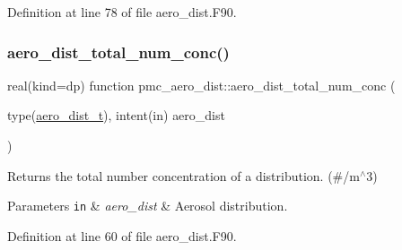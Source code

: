 Definition at line 78 of file aero\+\_\+dist.\+F90.

\mbox{\label{namespacepmc__aero__dist_a1976c9bd301379b91f6c14668315bacf}} 
\subsubsection{\texorpdfstring{aero\+\_\+dist\+\_\+total\+\_\+num\+\_\+conc()}{aero\_dist\_total\_num\_conc()}}
{\footnotesize\ttfamily real(kind=dp) function pmc\+\_\+aero\+\_\+dist\+::aero\+\_\+dist\+\_\+total\+\_\+num\+\_\+conc (\begin{DoxyParamCaption}\item[{type(\mbox{\hyperlink{structpmc__aero__dist_1_1aero__dist__t}{aero\+\_\+dist\+\_\+t}}), intent(in)}]{aero\+\_\+dist }\end{DoxyParamCaption})}



Returns the total number concentration of a distribution. (\#/m$^\wedge$3) 


\begin{DoxyParams}[1]{Parameters}
\mbox{\tt in}  & {\em aero\+\_\+dist} & Aerosol distribution. \\
\hline
\end{DoxyParams}


Definition at line 60 of file aero\+\_\+dist.\+F90.

\mbox{\label{namespacepmc__aero__dist_a876b60eece43d39ab4d5c09a5a5d22d7}} 

